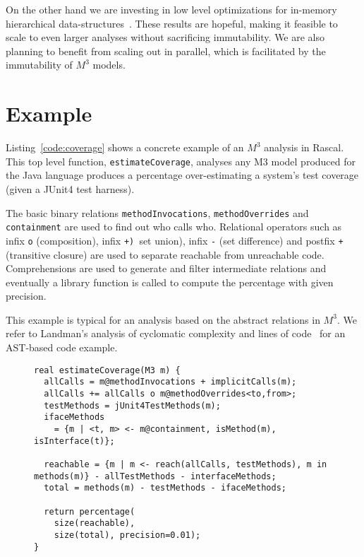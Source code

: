 \documentclass[conference]{IEEEtran}
\newcommand{\mthree}{\ensuremath{M^3}\xspace}
\begin{document}
On the other hand we are investing in low level optimizations for in-memory hierarchical data-structures~\cite{BJKO00,gpce}. These results are hopeful, making it feasible to scale to even larger analyses without sacrificing immutability. We are also planning to benefit from scaling out in parallel, which is facilitated by the immutability of \mthree models. 

\section{Example}

Listing~\ref{code:coverage} shows a concrete example of an \mthree analysis in Rascal. This top level function, \lstinline{estimateCoverage}, analyses any M3 model produced for the Java language produces a percentage over-estimating a system's test coverage  (given a JUnit4 test harness). 

The basic binary relations \lstinline{methodInvocations},  \lstinline{methodOverrides} and \lstinline{containment} are used to find out who calls who. Relational operators such as infix \lstinline{o} (composition), infix \lstinline(+) (set union), infix \lstinline{-} (set difference) and postfix \lstinline{+} (transitive closure) are used to separate reachable from unreachable code. Comprehensions are used to generate and filter intermediate relations and eventually a library function is called to compute the percentage with given precision. 

This example is typical for an analysis based on the abstract relations in \mthree. We refer to Landman's analysis of cyclomatic complexity and lines of code~\cite{davy} for an AST-based code example.

\begin{figure}[t]
\begin{lstlisting}[caption=Statically estimating test coverage using \mthree., label=code:coverage,language=rascal]
real estimateCoverage(M3 m) {
  allCalls = m@methodInvocations + implicitCalls(m);
  allCalls += allCalls o m@methodOverrides<to,from>;
  testMethods = jUnit4TestMethods(m);
  ifaceMethods 
    = {m | <t, m> <- m@containment, isMethod(m), isInterface(t)};
  
  reachable = {m | m <- reach(allCalls, testMethods), m in methods(m)} - allTestMethods - interfaceMethods;
  total = methods(m) - testMethods - ifaceMethods;
  
  return percentage(
    size(reachable), 
    size(total), precision=0.01);
}
\end{lstlisting}
\end{figure}
\end{document}
